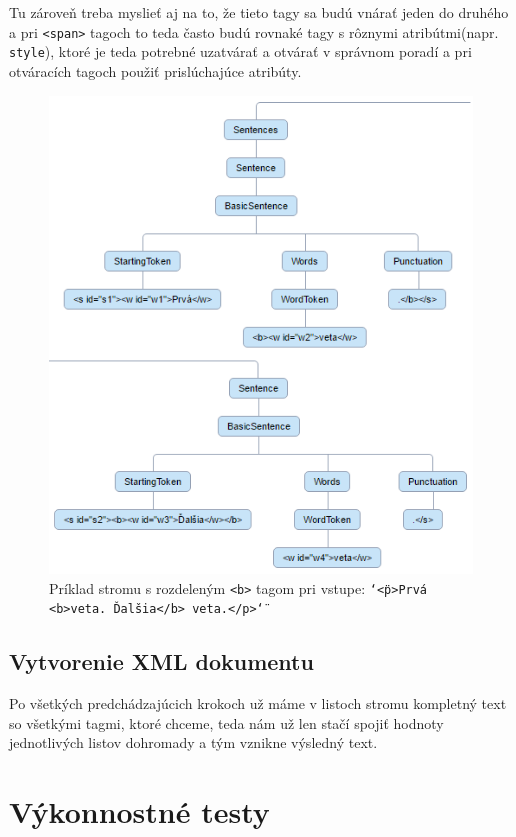 \documentclass[12pt,a4paper]{report}
\theoremstyle{definition}
\theoremstyle{remark}
\begin{document}
Tu zároveň treba myslieť aj na to, že tieto tagy sa budú vnárať jeden do druhého a pri \verb!<span>! tagoch to teda často budú rovnaké tagy s rôznymi atribútmi(napr. \verb!style!), ktoré je teda potrebné uzatvárať a otvárať v správnom poradí a pri otváracích tagoch použiť prislúchajúce atribúty.
\begin{figure}[H]
\centering
\includegraphics[scale=2.5]{dividedFormattingTags}
\captionsetup{width=.7\linewidth}
\caption{Príklad stromu s rozdeleným \texttt{<b>} tagom pri vstupe: \texttt{\char`\"<p>Prvá <b>veta. Ďalšia</b> veta.</p>\char`\"}}
\end{figure}

\section{Vytvorenie XML dokumentu}
Po všetkých predchádzajúcich krokoch už máme v listoch stromu kompletný text so všetkými tagmi, ktoré chceme, teda nám už len stačí spojiť hodnoty jednotlivých listov dohromady a tým vznikne výsledný text.

\chapter{Výkonnostné testy} \label{tests}
\pgfplotsset{width=0.9\textwidth, height=10cm}
\end{document}
